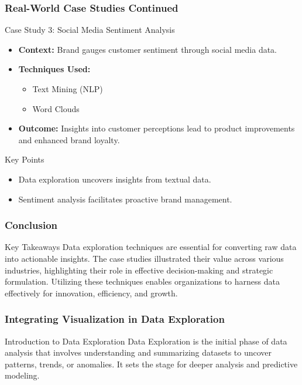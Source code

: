 \documentclass[aspectratio=169]{beamer}
\begin{document}
\begin{frame}[fragile]
    \frametitle{Real-World Case Studies Continued}
    \begin{block}{Case Study 3: Social Media Sentiment Analysis}
        \begin{itemize}
            \item \textbf{Context:} Brand gauges customer sentiment through social media data.
            \item \textbf{Techniques Used:}
                \begin{itemize}
                    \item Text Mining (NLP)
                    \item Word Clouds
                \end{itemize}
            \item \textbf{Outcome:} Insights into customer perceptions lead to product improvements and enhanced brand loyalty.
        \end{itemize}
    \end{block}

    \begin{block}{Key Points}
        \begin{itemize}
            \item Data exploration uncovers insights from textual data.
            \item Sentiment analysis facilitates proactive brand management.
        \end{itemize}
    \end{block}
\end{frame}

\begin{frame}[fragile]
    \frametitle{Conclusion}
    \begin{block}{Key Takeaways}
    Data exploration techniques are essential for converting raw data into actionable insights. The case studies illustrated their value across various industries, highlighting their role in effective decision-making and strategic formulation. Utilizing these techniques enables organizations to harness data effectively for innovation, efficiency, and growth.
    \end{block}
\end{frame}

\begin{frame}[fragile]
    \frametitle{Integrating Visualization in Data Exploration}
    \begin{block}{Introduction to Data Exploration}
        Data Exploration is the initial phase of data analysis that involves understanding and summarizing datasets to uncover patterns, trends, or anomalies. It sets the stage for deeper analysis and predictive modeling.
    \end{block}
\end{frame}
\end{document}
